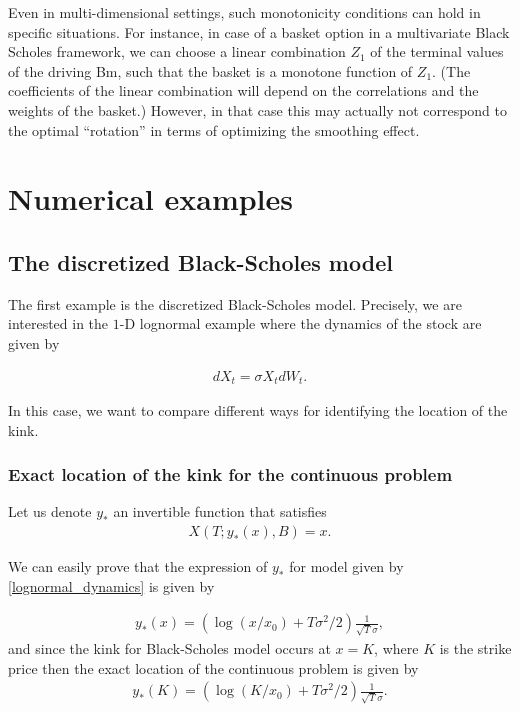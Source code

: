 \documentclass[11pt]{article}
\begin{document}
Even in multi-dimensional settings, such monotonicity conditions can hold in
specific situations. For instance, in case of a basket option in a
multivariate Black Scholes framework, we can choose a linear combination $Z_1$
of the terminal values of the driving Bm, such that the basket is a monotone
function of $Z_1$. (The coefficients of the linear combination will depend on
the correlations and the weights of the basket.) However, in that case this
may actually not correspond to the optimal ``rotation'' in terms of
optimizing the smoothing effect.

 
 
 \section{Numerical examples}
 \subsection{The discretized Black-Scholes
 	model}
 
 The first example is the discretized Black-Scholes model. Precisely, we are interested in the  $1$-D lognormal example where the dynamics of the stock are given by
 
 \begin{align}\label{lognormal_dynamics}
 	dX_t=\sigma X_t dW_t.
 \end{align}
 
 In this case, we want to compare different ways for identifying the location of the kink. 
 \subsubsection{Exact location of the kink for the continuous problem}
 Let us denote $y_{\ast}$ an invertible function that satisfies 
 \begin{align}
 	X(T;y_{\ast}(x),B)=x.
 \end{align}
 
 We can easily prove that the expression of $y_{\ast}$ for model given by \eqref{lognormal_dynamics} is given by
 
 \begin{align}
 	y_{\ast}(x)=\left(\operatorname{log}(x/x_0)+T \sigma^2/2\right) \frac{1}{\sqrt{T} \sigma}, 
 \end{align}
 and since the kink for Black-Scholes model occurs at $x=K$, where $K
 $ is the strike price then  the exact location of the continuous problem is given by 
 \begin{align}\label{xact_location_continuous_problem}
 	y_{\ast}(K)=\left(\operatorname{log}(K/x_0)+T \sigma^2/2\right) \frac{1}{\sqrt{T} \sigma}.
 \end{align}
 
\end{document}
